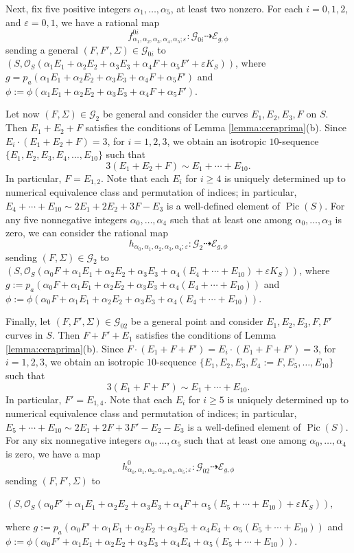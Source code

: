 \documentclass[11pt]{amsart}
\theoremstyle{definition}
\def\G{{\mathcal G}}
\def\O{{\mathcal O}}
\def\E{{\mathcal E}}
\def\Pic{\operatorname{Pic}}
\begin{document}
 
Next, fix five positive integers $\alpha_1,\ldots,\alpha_5$, at least two nonzero. For each $i=0,1,2$,  and $\varepsilon=0,1$,  we have a rational map
\[ f^{0i}_{\alpha_1,\alpha_2,\alpha_3, \alpha_4,\alpha_5; \varepsilon}: \G_{0i} \dasharrow \E_{g,\phi}\]
sending   a general  $(F,F', \Sigma)\in \G_{0i}$  to $\left(S,\O_{S}(\alpha_1E_1+\alpha_2E_2+\alpha_3E_3+\alpha_4F+\alpha_5F'+\varepsilon K_S)\right)$, where
$g=p_a(\alpha_1E_1+\alpha_2E_2+\alpha_3E_3+\alpha_4F+\alpha_5F')$ and $\phi:=\phi(\alpha_1E_1+\alpha_2E_2+\alpha_3E_3+\alpha_4F+\alpha_5F')$. 


Let now $(F,\Sigma) \in \G_2$  be general  and consider  the curves $E_1,E_2,E_3, F $  on $S$. Then $E_1+E_2+F$ satisfies the conditions of Lemma \ref{lemma:ceraprima}(b). Since $E_i \cdot (E_1+E_2+F)=3$, for $i=1,2,3$, we obtain an isotropic $10$-sequence $\{E_1,E_2,E_3,E_4,\ldots, E_{10}\}$ such that 
\[ 3(E_1+E_2+F) \sim E_1 + \cdots + E_{10}.\]
\color{black} In particular, $F=E_{1,2}$. \color{black}
Note that each $E_i$ for $i \geqslant 4$ is uniquely determined up to numerical equivalence class and permutation of indices; in particular, $E_4+\cdots+E_{10} \sim
2E_1+2E_2+3F-E_3$ is a well-defined element of $\Pic (S)$. 
For any 
five nonnegative integers $\alpha_0,\ldots,\alpha_4$ such that at least one among $\alpha_0,\ldots,\alpha_3$ is zero, we can consider the rational map
\[ h_{\alpha_0,\alpha_1,\alpha_2,\alpha_3, \alpha_4; \varepsilon}: \G_2 \dasharrow \E_{g,\phi}\]
sending $(F,\Sigma)\in \G_2$ to $(S,\O_{S}(\alpha_0F+\alpha_1E_1+\alpha_2E_2+\alpha_3E_3+\alpha_4(E_4+\cdots+E_{10})+\varepsilon K_S))$, where
$g:=p_a(\alpha_0F+\alpha_1E_1+\alpha_2E_2+\alpha_3E_3+\alpha_4(E_4+\cdots+E_{10}))$ and 
 $\phi:=\phi(\alpha_0F+\alpha_1E_1+\alpha_2E_2+\alpha_3E_3+\alpha_4(E_4+\cdots+E_{10}))$. 


Finally, let $(F,F',\Sigma) \in \G_{02}$ be a general point and consider $E_1,E_2,E_3, F,F'$ curves in $S$. Then $F+F'+E_1$ satisfies the conditions of Lemma \ref{lemma:ceraprima}(b). Since $F\cdot (E_1+F+F')=
E_i \cdot (E_1+F+F')=3$, for $i=1,2,3$, we obtain an isotropic $10$-sequence $\{E_1,E_2,E_3,E_4:=F,E_5,\ldots, E_{10}\}$ such that 
\[ 3(E_1+F+F') \sim E_1 + \cdots + E_{10}.\]
\color{black} In particular, $F'=E_{1,4}.$ \color{black}
Note that each $E_i$ for $i \geqslant 5$ is uniquely determined up to numerical equivalence class and permutation of indices; in particular, $E_5+\cdots+E_{10} \sim
2E_1+2F+3F'-E_2-E_3$ is a well-defined element of $\Pic (S)$. For any 
six nonnegative integers $\alpha_0,\ldots,\alpha_5$ such that at least one among $\alpha_0,\ldots,\alpha_4$ is zero, we have a map 
\[ h^0_{\alpha_0,\alpha_1,\alpha_2,\alpha_3, \alpha_4,\alpha_5; \varepsilon}: \G_{02} \dasharrow \E_{g,\phi}\]
sending $(F,F',\Sigma)$ to 
\begin{small}
$(S,\O_{S}(\alpha_0F'+\alpha_1E_1+\alpha_2E_2+\alpha_3E_3+\alpha_4F+\alpha_5(E_5+\cdots+E_{10})+\varepsilon K_S)),$
\end{small} where
$g:=p_a(\alpha_0F'+\alpha_1E_1+\alpha_2E_2+\alpha_3E_3+\alpha_4E_4+\alpha_5(E_5+ \cdots+E_{10}))$ and 
 $\phi:=\phi(\alpha_0F'+\alpha_1E_1+\alpha_2E_2+\alpha_3E_3+\alpha_4E_4+\alpha_5(E_5+\cdots+E_{10}))$. 
\end{document}
